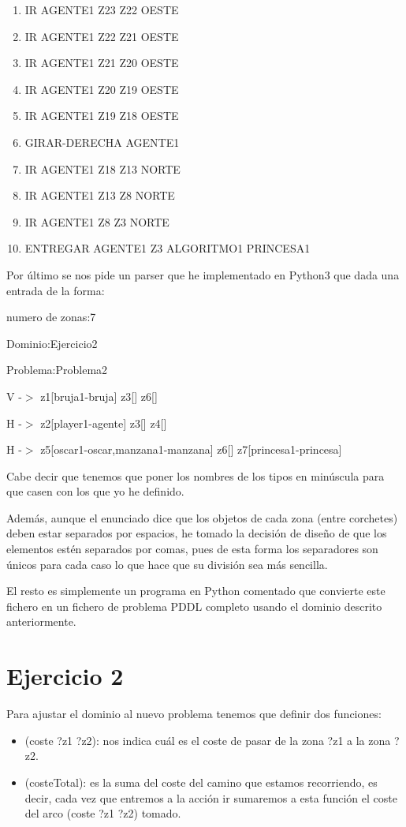 \documentclass[12pt,a4paper]{article}
\begin{document}
\begin{enumerate}
	\item IR AGENTE1 Z23 Z22 OESTE
	\item IR AGENTE1 Z22 Z21 OESTE
	\item IR AGENTE1 Z21 Z20 OESTE
	\item IR AGENTE1 Z20 Z19 OESTE
	\item IR AGENTE1 Z19 Z18 OESTE
	\item GIRAR-DERECHA AGENTE1
	\item IR AGENTE1 Z18 Z13 NORTE
	\item IR AGENTE1 Z13 Z8 NORTE
	\item IR AGENTE1 Z8 Z3 NORTE
	\item ENTREGAR AGENTE1 Z3 ALGORITMO1 PRINCESA1
\end{enumerate}

Por último se nos pide un parser que he implementado en Python3 que dada una entrada de la forma:

numero de zonas:7

Dominio:Ejercicio2

Problema:Problema2

V -$>$ z1[bruja1-bruja] z3[] z6[]

H -$>$ z2[player1-agente] z3[] z4[]

H -$>$ z5[oscar1-oscar,manzana1-manzana] z6[] z7[princesa1-princesa]

Cabe decir que tenemos que poner los nombres de los tipos en minúscula para que casen con los que yo he definido. 

Además, aunque el enunciado dice que los objetos de cada zona (entre corchetes) deben estar separados por espacios, he tomado la decisión de diseño de que los elementos estén separados por comas, pues de  esta forma los separadores son únicos para cada caso lo que hace que su división sea más sencilla.

El resto es simplemente un programa en Python comentado que convierte este fichero en un fichero de problema PDDL completo usando el dominio descrito anteriormente.

\section{Ejercicio 2}

Para ajustar el dominio al nuevo problema tenemos que definir dos funciones:

\begin{itemize}
	\item (coste ?z1 ?z2): nos indica cuál es el coste de pasar de la zona ?z1 a la zona ?z2.
	\item (costeTotal): es la suma del coste del camino que estamos recorriendo, es decir, cada vez que entremos a la acción ir sumaremos a esta función el coste del arco (coste ?z1 ?z2) tomado.
\end{itemize}
\end{document}
